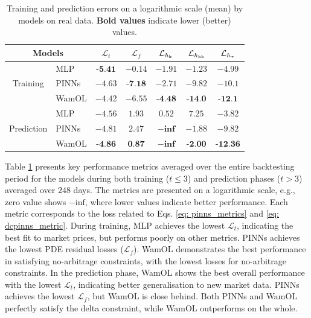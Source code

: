 \documentclass[sigconf, authorversion=true, nonacm=true]{acmart}
\begin{document}
\begin{table}[H]
    \centering
    \caption{Training and prediction errors on a logarithmic scale (mean) by models on real data. \textbf{Bold values} indicate lower (better) values.}
    \label{tab: backtesting_metrics}
    \begin{tabular}{clccccc}
    \toprule
    \multicolumn{2}{c}{Models} & $\mathcal{L}_t$ & $\mathcal{L}_f$ & $\mathcal{L}_{h_{\rm k}}$ & $\mathcal{L}_{h_{\rm kk}}$ & $\mathcal{L}_{h_{\rm \tau}}$\\
    \midrule
    \multirow{3}{*}{Training}
    &MLP & $\textbf{-5.41}$ & $-0.14$ & $-1.91$ & $-1.23$ & $-4.99$ \\
    &PINNs & $-4.63$ & $\textbf{-7.18}$ & $-2.71$ & $-9.82$ & $-10.1$ \\
    &WamOL & $-4.42$ & $-6.55$ & $\textbf{-4.48}$ & $\textbf{-14.0}$ & $\textbf{-12.1}$ \\
    \hline%
    \multirow{3}{*}{Prediction}
    &MLP & $-4.56$ & $1.93$ & $0.52$ & $7.25$ & $-3.82$ \\
    &PINNs & $-4.81$ & $2.47$ & $-\textbf{inf}$ & $-1.88$ & $-9.82$ \\
    &WamOL & $\textbf{-4.86}$ & $\textbf{0.87}$ & $-\textbf{inf}$ & $\textbf{-2.00}$ & $\textbf{-12.36}$ \\
    \bottomrule
    \end{tabular}
\end{table}
Table \ref{tab: backtesting_metrics} presents key performance metrics averaged over the entire backtesting period for the models during both training ($t\leq3$) and prediction phases ($t>3$) averaged over $248$ days. The metrics are presented on a logarithmic scale, e.g., zero value shows $-\text{inf}$, where lower values indicate better performance. Each metric corresponds to the loss related to Eqs. \eqref{eq: pinns_metrics} and \eqref{eq: dcpinns_metric}. During training, MLP achieves the lowest $\mathcal{L}_t$, indicating the best fit to market prices, but performs poorly on other metrics. PINNs achieves the lowest PDE residual losses ($\mathcal{L}_f$). WamOL demonstrates the best performance in satisfying no-arbitrage constraints, with the lowest losses for no-arbitrage constraints. In the prediction phase, WamOL shows the best overall performance with the lowest $\mathcal{L}_t$, indicating better generalisation to new market data. PINNs achieves the lowest $\mathcal{L}_f$, but WamOL is close behind. Both PINNs and WamOL perfectly satisfy the delta constraint, while WamOL outperforms on the whole.
\end{document}
